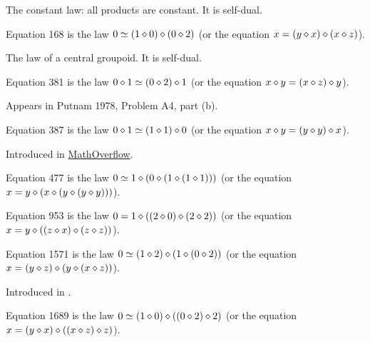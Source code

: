 The constant law: all products are constant. It is self-dual.

\begin{definition}[Equation 168]\label{eq168}\leanok{}  Equation 168 is the law $0  \simeq  (1 \diamond 0) \diamond (0 \diamond 2)$ (or the equation $x = (y \diamond x) \diamond (x \diamond z)$).
\end{definition}

The law of a central groupoid. It is self-dual.

\begin{definition}[Equation 381]\label{eq381}\leanok{}  Equation 381 is the law $0 \diamond 1  \simeq  (0 \diamond 2) \diamond 1$ (or the equation $x \diamond y = (x \diamond z) \diamond y$).
\end{definition}

Appears in Putnam 1978, Problem A4, part (b).

\begin{definition}[Equation 387]\label{eq387}\leanok{}  Equation 387 is the law $0 \diamond 1  \simeq  (1 \diamond 1) \diamond 0$ (or the equation $x \diamond y = (y \diamond y) \diamond x$).
\end{definition}

Introduced in \href{https://mathoverflow.net/a/450905/766}{MathOverflow}.

\begin{definition}[Equation 477]\label{eq477}\leanok{}  Equation 477 is the law $0 \simeq 1 \diamond (0 \diamond (1 \diamond (1 \diamond 1)))$ (or the equation $x = y \diamond (x \diamond (y \diamond (y \diamond y)))$).
\end{definition}

\begin{definition}[Equation 953]\label{eq953}\leanok{}  Equation 953 is the law $0 = 1 \diamond ((2 \diamond 0) \diamond (2 \diamond 2))$ (or the equation $x = y \diamond ((z \diamond x) \diamond (z \diamond z))$).
\end{definition}

\begin{definition}[Equation 1571]\label{eq1571}\leanok{}  Equation 1571 is the law $0 \simeq  (1 \diamond 2) \diamond (1 \diamond (0 \diamond 2))$ (or the equation $x = (y \diamond z) \diamond (y \diamond (x \diamond z))$).
\end{definition}

Introduced in \cite{mendelsohn-padmanabhan}.

\begin{definition}[Equation 1689]\label{eq1689}\leanok{}  Equation 1689 is the law $0 \simeq  (1 \diamond 0) \diamond ((0 \diamond 2) \diamond 2)$ (or the equation $x = (y \diamond x) \diamond ((x \diamond z) \diamond z)$).
\end{definition}

